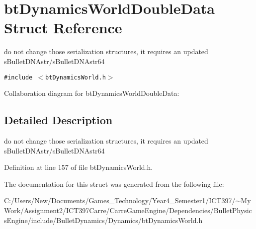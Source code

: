 \hypertarget{structbt_dynamics_world_double_data}{
\section{btDynamicsWorldDoubleData Struct Reference}
\label{structbt_dynamics_world_double_data}
}
do not change those serialization structures, it requires an updated sBulletDNAstr/sBulletDNAstr64  


{\tt \#include $<$btDynamicsWorld.h$>$}

Collaboration diagram for btDynamicsWorldDoubleData:

\subsection{Detailed Description}
do not change those serialization structures, it requires an updated sBulletDNAstr/sBulletDNAstr64 

Definition at line 157 of file btDynamicsWorld.h.

The documentation for this struct was generated from the following file:\begin{CompactItemize}
\item 
C:/Users/New/Documents/Games\_\-Technology/Year4\_\-Semester1/ICT397/$\sim$My Work/Assignment2/ICT397Carre/CarreGameEngine/Dependencies/BulletPhysicsEngine/include/BulletDynamics/Dynamics/btDynamicsWorld.h\end{CompactItemize}
